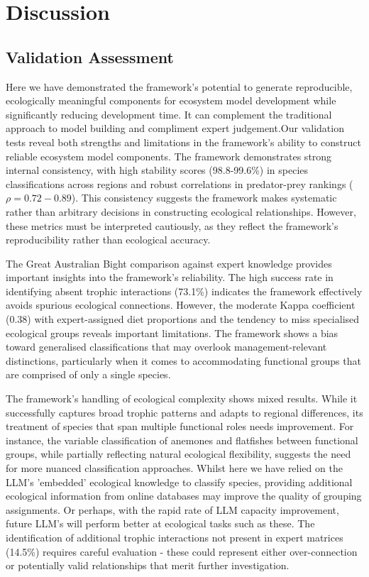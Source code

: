 \section{Discussion}

\subsection{Validation Assessment}

Here we have demonstrated the framework’s potential to generate reproducible, ecologically meaningful components for ecosystem model development while significantly reducing development time. It can complement the traditional approach to model building and compliment expert judgement.Our validation tests reveal both strengths and limitations in the framework's ability to construct reliable ecosystem model components. The framework demonstrates strong internal consistency, with high stability scores (98.8-99.6\%) in species classifications across regions and robust correlations in predator-prey rankings ($\rho = 0.72-0.89$). This consistency suggests the framework makes systematic rather than arbitrary decisions in constructing ecological relationships. However, these metrics must be interpreted cautiously, as they reflect the framework's reproducibility rather than ecological accuracy.

The Great Australian Bight comparison against expert knowledge provides important insights into the framework's reliability. The high success rate in identifying absent trophic interactions (73.1\%) indicates the framework effectively avoids spurious ecological connections. However, the moderate Kappa coefficient (0.38) with expert-assigned diet proportions and the tendency to miss specialised ecological groups reveals important limitations. The framework shows a bias toward generalised classifications that may overlook management-relevant distinctions, particularly when it comes to accommodating functional groups that are comprised of only a single species. 

The framework's handling of ecological complexity shows mixed results. While it successfully captures broad trophic patterns and adapts to regional differences, its treatment of species that span multiple functional roles needs improvement. For instance, the variable classification of anemones and flatfishes between functional groups, while partially reflecting natural ecological flexibility, suggests the need for more nuanced classification approaches. Whilst here we have relied on the LLM's 'embedded' ecological knowledge to classify species, providing additional ecological information from online databases may improve the quality of grouping assignments. Or perhaps, with the rapid rate of LLM capacity improvement, future LLM's will perform better at ecological tasks such as these. The identification of additional trophic interactions not present in expert matrices (14.5\%) requires careful evaluation - these could represent either over-connection or potentially valid relationships that merit further investigation.

